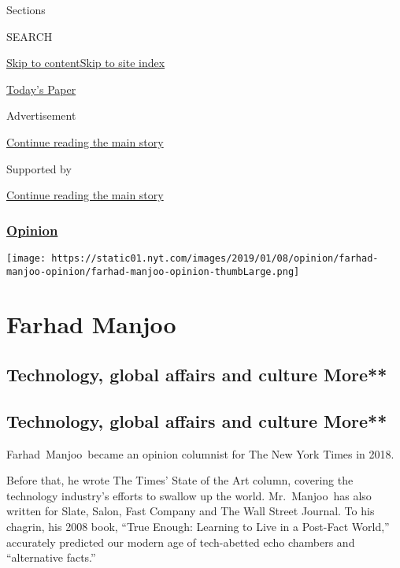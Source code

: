 Sections

SEARCH

\protect\hyperlink{site-content}{Skip to
content}\protect\hyperlink{site-index}{Skip to site index}

\href{https://myaccount.nytimes.com/auth/login?response_type=cookie\&client_id=vi}{}

\href{https://www.nytimes.com/section/todayspaper}{Today's Paper}

Advertisement

\protect\hyperlink{after-top}{Continue reading the main story}

Supported by

\protect\hyperlink{after-sponsor}{Continue reading the main story}

\hypertarget{opinion}{%
\subsubsection{\texorpdfstring{\href{/section/opinion}{Opinion}}{Opinion}}\label{opinion}}

\texttt{[image: https://static01.nyt.com/images/2019/01/08/opinion/farhad-manjoo-opinion/farhad-manjoo-opinion-thumbLarge.png]}

\hypertarget{farhad-manjoo}{%
\section{Farhad Manjoo}\label{farhad-manjoo}}

\hypertarget{technology-global-affairs-and-culture-more}{%
\subsection{Technology, global affairs and culture
More**}\label{technology-global-affairs-and-culture-more}}

\hypertarget{technology-global-affairs-and-culture-more-1}{%
\subsection{Technology, global affairs and culture
More**}\label{technology-global-affairs-and-culture-more-1}}

Farhad~Manjoo~became an opinion columnist for The New York Times in
2018.~

Before that, he wrote The Times' State of the Art column, covering the
technology industry's efforts to swallow up the world. Mr.~Manjoo~has
also written for Slate, Salon, Fast Company and The Wall Street Journal.
To his chagrin, his 2008 book, ``True Enough: Learning to Live in a
Post-Fact World,'' accurately predicted our modern age of tech-abetted
echo chambers and ``alternative facts.''

